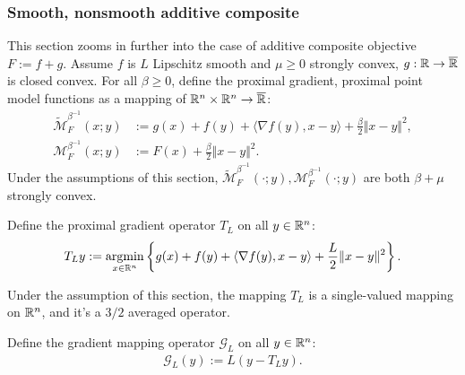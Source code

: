 \documentclass[12pt]{article}
\begin{document}
        \subsubsection{Smooth, nonsmooth additive composite}\label{sssec:additive-composite}
            This section zooms in further into the case of additive composite objective $F:= f + g$. 
            Assume $f$ is $L$ Lipschitz smooth and $\mu \ge 0$ strongly convex, $g: \mathbb R\rightarrow \overline {\mathbb R}$ is closed convex. 
            For all $\beta \ge 0$, define the proximal gradient, proximal point model functions as a mapping of $\mathbb R^n \times \mathbb R^n \rightarrow \overline {\mathbb R}$: 
            \begin{align*}
                \widetilde{\mathcal M}^{\beta^{-1}}_F
                (x; y)
                &:= 
                g(x) + f(y) + \langle \nabla f(y), x - y\rangle
                + \frac{\beta}{2}\Vert x - y\Vert^2,
                \\
                \mathcal M^{\beta^{-1}}_F(x; y) 
                &:= F(x) + \frac{\beta}{2}\Vert x - y\Vert^2.
            \end{align*}
            Under the assumptions of this section, $\widetilde {\mathcal M}_F^{\beta^{-1}} (\cdot; y),  {\mathcal M}_F^{\beta^{-1}}(\cdot;y )$ are both $\beta + \mu$ strongly convex. 
            \begin{definition}\label{def:proximal-gradient-operator}
                Define the proximal gradient operator $T_L$ on all $y \in \mathbb R^n$: 
                \begin{align*}
                    T_L y := \mathop{\rm argmin}\limits_{x \in \mathbb R^n} \left\lbrace
                        g(x) + f(y) + \langle \nabla f(y), x - y\rangle 
                        + \frac{L}{2}\Vert x- y \Vert^2
                    \right\rbrace. 
                \end{align*}
            \end{definition}
            \begin{remark}
                Under the assumption of this section, the mapping $T_L$ is a single-valued mapping on $\mathbb R^n$, and it's  a $3/2$ averaged operator. 
            \end{remark}
            \begin{definition}\label{def:gradient-mapping-operator}
                Define the gradient mapping operator $\mathcal G_L$ on all $y \in \mathbb R^n$: 
                \begin{align*}
                    \mathcal G_L (y):= L(y - T_L y). 
                \end{align*}
            \end{definition}
\end{document}
